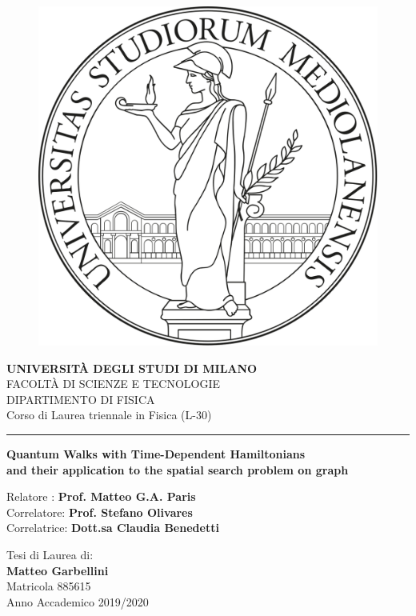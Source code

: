 \documentclass[11pt, twoside]{report}
\begin{document}
\begin{titlepage}
    \begin{center}
        \begin{figure}[hbt!]
             \centering
             \includegraphics[width=0.3 \textwidth]{./figures/unimi_logo_tesi}
        \end{figure}
        \textbf{\Large{UNIVERSIT\`A DEGLI STUDI DI MILANO}}\\
        \vspace{12pt}
        \Large{FACOLT\`A DI SCIENZE E TECNOLOGIE}\\
        \Large{DIPARTIMENTO DI FISICA}\\
        \Large{Corso di Laurea triennale in Fisica (L-30)}
        \vspace{24pt}
        \hrule
        \vspace{24pt}
        \textbf{\Large{Quantum Walks with Time-Dependent Hamiltonians}\\ \large{and their application to the spatial search problem on graph}} \\

    \end{center}
    \vspace{120pt}
    \begin{flushleft}
        Relatore : \textbf{Prof. Matteo G.A. Paris}\\
        Correlatore: \textbf{Prof. Stefano Olivares}\\
        Correlatrice: \textbf{Dott.sa Claudia Benedetti}
    \end{flushleft}
    \vspace{12pt}
    \begin{flushright}
        Tesi di Laurea di:\\
        \textbf{Matteo Garbellini}\\
        Matricola 885615\\
        Anno Accademico 2019/2020
    \end{flushright}
\end{titlepage}
\newpage
\end{document}
